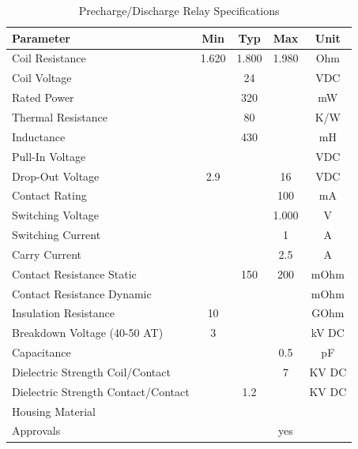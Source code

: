 \begin{table}[H]
    \centering
    \begin{tabular}{|l|c|c|c|c|}
    \hline
    \textbf{Parameter} & \textbf{Min} & \textbf{Typ} & \textbf{Max} & \textbf{Unit} \\
    \hline
    Coil Resistance & 1.620 & 1.800 & 1.980 & Ohm \\
    Coil Voltage & & 24 & & VDC \\
    Rated Power & & 320 & & mW \\
    Thermal Resistance & & 80 & & K/W \\
    Inductance & & 430 & & mH \\
    Pull-In Voltage & & & & VDC \\
    Drop-Out Voltage & 2.9 & & 16 & VDC \\
    Contact Rating & & & 100 & mA \\
    Switching Voltage & & & 1.000 & V \\
    Switching Current & & & 1 & A \\
    Carry Current & & & 2.5 & A \\
    Contact Resistance Static & & 150 & 200 & mOhm \\
    Contact Resistance Dynamic & & & & mOhm \\
    Insulation Resistance & 10 & & & GOhm \\
    Breakdown Voltage (40-50 AT) & 3 & & & kV DC \\
    Capacitance & & & 0.5 & pF \\
    Dielectric Strength Coil/Contact & & & 7 & KV DC \\
    Dielectric Strength Contact/Contact & & 1.2 & & KV DC \\
    Housing Material & & & & \\
    Approvals & & & yes & \\
    \hline
    \end{tabular}
    \caption{Precharge/Discharge Relay Specifications}
    \label{tab:precharge-relay-specs}
\end{table}


